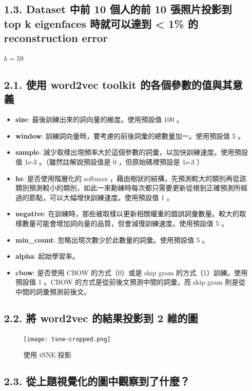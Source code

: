 \documentclass[fleqn,a4paper,12pt]{article}
\begin{document}
\subsection*{1.3. Dataset 中前 10 個人的前 10 張照片投影到 top k eigenfaces 時就可以達到 < 1\% 的 reconstruction error}

$k = 59$

\subsection*{2.1. 使用 word2vec toolkit 的各個參數的值與其意義}

\begin{itemize}
\item \textbf{size}: 最後訓練出來的詞向量的維度。使用預設值 100 。
\item \textbf{window}: 訓練詞向量時，要考慮的前後詞彙的總數量加一。使用預設值 5 。
\item \textbf{sample}: 減少取樣出現頻率大於這個參數的詞彙，以加快訓練速度。使用預設值 1e-3 。（雖然註解說預設值是 0 ，但原始碼裡預設是 1e-3 ）
\item \textbf{hs}: 是否使用階層化的 softmax ，藉由樹狀的結構，先預測較大的類別再從該類別預測較小的類別，如此一來勳練時每次都只需要更新從根到正確預測所經過的節點，可以大幅增快訓練速度。使用預設值 1 。
\item \textbf{negative}: 在訓練時，那些被取樣以更新相關權重的錯誤詞彙數量。較大的取樣數量可能會增加詞向量的品質，但會減慢訓練速度。使用預設值 5 。
\item \textbf{min\_count}: 忽略出現次數少於此數量的詞彙。使用預設值 5 。
\item \textbf{alpha}: 起始學習率。
\item \textbf{cbow}: 是否使用 CBOW 的方式（0）或是 skip gram 的方式（1）訓練。使用預設值 1 。CBOW 的方式是從前後文預測中間的詞彙，而 skip gram 則是從中間的詞彙預測前後文。
\end{itemize}

\subsection*{2.2. 將 word2vec 的結果投影到 2 維的圖}

\begin{figure}[H]
\centering
\texttt{[image: tsne-cropped.png]}
\caption{使用 tSNE 投影}
\label{fig:p2.2}
\end{figure}


\subsection*{2.3. 從上題視覺化的圖中觀察到了什麼？}
\end{document}
